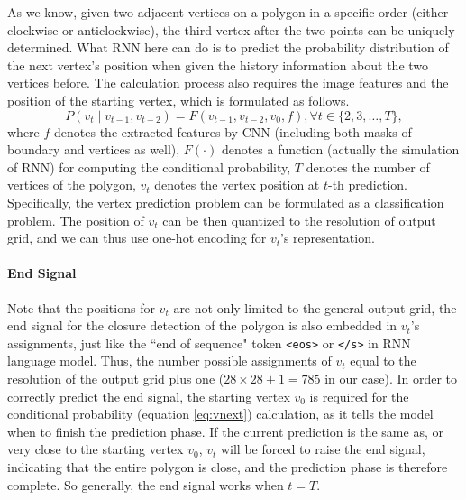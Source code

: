 As we know, given two adjacent vertices on a polygon in a specific order (either clockwise or anticlockwise), the third vertex after the two points can be uniquely determined. What RNN here can do is to predict the probability distribution of the next vertex's position when given the history information about the two vertices before. The calculation process also requires the image features and the position of the starting vertex, which is formulated as follows.
\begin{equation}\label{eq:vnext}
	P(v_t \mid v_{t-1}, v_{t-2}) = F(v_{t-1}, v_{t-2}, v_0, f), \forall t \in \{2,3,\ldots,T\},
\end{equation}
where $f$ denotes the extracted features by CNN (including both masks of boundary and vertices as well), $F(\cdot)$ denotes a function (actually the simulation of RNN) for computing the conditional probability, $T$ denotes the number of vertices of the polygon, $v_t$ denotes the vertex position at $t$-th prediction. Specifically, the vertex prediction problem can be formulated as a classification problem. The position of $v_t$ can be then quantized to the resolution of output grid, and we can thus use one-hot encoding for $v_t$'s representation.

\paragraph{End Signal} Note that the positions for $v_t$ are not only limited to the general output grid, the end signal for the closure detection of the polygon is also embedded in $v_t$'s assignments, just like the ``end of sequence" token \lstinline{<eos>} or \lstinline{</s>} in RNN language model. Thus, the number possible assignments of $v_t$ equal to the resolution of the output grid plus one ($28\times28+1=785$ in our case). In order to correctly predict the end signal, the starting vertex $v_0$ is required for the conditional probability (equation \ref{eq:vnext}) calculation, as it tells the model when to finish the prediction phase. If the current prediction is the same as, or very close to the starting vertex $v_0$, $v_t$ will be forced to raise the end signal, indicating that the entire polygon is close, and the prediction phase is therefore complete. So generally, the end signal works when $t=T$.

